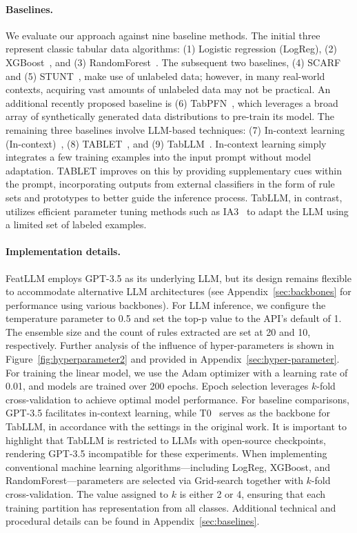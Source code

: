 \vspace*{-0.12in}
\paragraph{Baselines.}
We evaluate our approach against nine baseline methods. The initial three represent classic tabular data algorithms: (1) Logistic regression (LogReg), (2) XGBoost~\cite{chen2016xgboost}, and (3) RandomForest~\cite{ho1995random}. The subsequent two baselines, (4) SCARF~\cite{bahri2022scarf} and (5) STUNT~\cite{nam2023stunt}, make use of unlabeled data; however, in many real-world contexts, acquiring vast amounts of unlabeled data may not be practical. An additional recently proposed baseline is (6) TabPFN~\cite{hollmann2022tabpfn}, which leverages a broad array of synthetically generated data distributions to pre-train its model. The remaining three baselines involve LLM-based techniques: (7) In-context learning (In-context)~\cite{wei2022emergent}, (8) TABLET~\cite{slack2023tablet}, and (9) TabLLM~\cite{hegselmann2023tabllm}. In-context learning simply integrates a few training examples into the input prompt without model adaptation. TABLET improves on this by providing supplementary cues within the prompt, incorporating outputs from external classifiers in the form of rule sets and prototypes to better guide the inference process. TabLLM, in contrast, utilizes efficient parameter tuning methods such as IA3~\cite{liu2022few} to adapt the LLM using a limited set of labeled examples.

\vspace*{-0.12in}
\paragraph{Implementation details.}
\textsf{FeatLLM} employs GPT-3.5 as its underlying LLM, but its design remains flexible to accommodate alternative LLM architectures (see Appendix~\ref{sec:backbones} for performance using various backbones). For LLM inference, we configure the temperature parameter to 0.5 and set the top-p value to the API's default of 1. The ensemble size and the count of rules extracted are set at 20 and 10, respectively. Further analysis of the influence of hyper-parameters is shown in Figure~\ref{fig:hyperparameter2} and provided in Appendix~\ref{sec:hyper-parameter}. For training the linear model, we use the Adam optimizer with a learning rate of 0.01, and models are trained over 200 epochs. Epoch selection leverages $k$-fold cross-validation to achieve optimal model performance. For baseline comparisons, GPT-3.5 facilitates in-context learning, while T0~\cite{sanh2022multitask} serves as the backbone for TabLLM, in accordance with the settings in the original work. It is important to highlight that TabLLM is restricted to LLMs with open-source checkpoints, rendering GPT-3.5 incompatible for these experiments. When implementing conventional machine learning algorithms—including LogReg, XGBoost, and RandomForest—parameters are selected via Grid-search together with $k$-fold cross-validation. The value assigned to $k$ is either 2 or 4, ensuring that each training partition has representation from all classes. Additional technical and procedural details can be found in Appendix~\ref{sec:baselines}.

